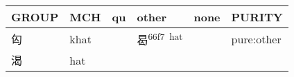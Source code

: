 \documentclass[14pt,a4paper]{scrartcl}
\begin{document}
\begin{longtable}[c]{@{}llllll@{}}
\toprule
\begin{minipage}[b]{0.14\columnwidth}\raggedright\strut
GROUP
\strut\end{minipage} &
\begin{minipage}[b]{0.14\columnwidth}\raggedright\strut
MCH
\strut\end{minipage} &
\begin{minipage}[b]{0.14\columnwidth}\raggedright\strut
qu
\strut\end{minipage} &
\begin{minipage}[b]{0.14\columnwidth}\raggedright\strut
other
\strut\end{minipage} &
\begin{minipage}[b]{0.14\columnwidth}\raggedright\strut
none
\strut\end{minipage} &
\begin{minipage}[b]{0.14\columnwidth}\raggedright\strut
PURITY
\strut\end{minipage}\tabularnewline
\midrule
\endhead
\begin{minipage}[t]{0.14\columnwidth}\raggedright\strut
匃
\strut\end{minipage} &
\begin{minipage}[t]{0.14\columnwidth}\raggedright\strut
khat
\strut\end{minipage} &
\begin{minipage}[t]{0.14\columnwidth}\raggedright\strut
\strut\end{minipage} &
\begin{minipage}[t]{0.14\columnwidth}\raggedright\strut
曷\textsuperscript{66f7~hat}
\strut\end{minipage} &
\begin{minipage}[t]{0.14\columnwidth}\raggedright\strut
\strut\end{minipage} &
\begin{minipage}[t]{0.14\columnwidth}\raggedright\strut
pure:other
\strut\end{minipage}\tabularnewline
\begin{minipage}[t]{0.14\columnwidth}\raggedright\strut
渴
\strut\end{minipage} &
\begin{minipage}[t]{0.14\columnwidth}\raggedright\strut
hat
\strut\end{minipage} &
\begin{minipage}[t]{0.14\columnwidth}\raggedright\strut
\strut\end{minipage} &
\begin{minipage}[t]{0.14\columnwidth}\raggedright\strut

\end{minipage}
\end{longtable}
\end{document}
